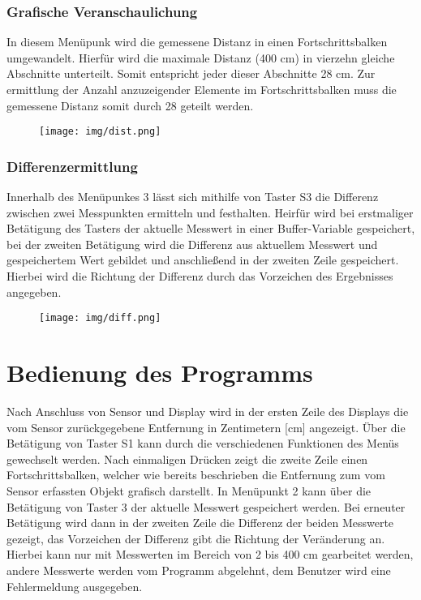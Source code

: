 \documentclass[german]{article}
\begin{document}
\subsubsection{Grafische Veranschaulichung}

In diesem Menüpunk wird die gemessene Distanz in einen Fortschrittsbalken umgewandelt. Hierfür wird die maximale Distanz (400 cm) in vierzehn gleiche Abschnitte unterteilt. Somit entspricht jeder dieser Abschnitte 28 cm. Zur ermittlung der Anzahl anzuzeigender Elemente im Fortschrittsbalken muss die gemessene Distanz somit durch 28 geteilt werden.
\begin{figure}[H]\centering\texttt{[image: img/dist.png]}\end{figure}

\subsubsection{Differenzermittlung}

Innerhalb des Menüpunkes 3 lässt sich mithilfe von Taster S3 die Differenz zwischen zwei Messpunkten ermitteln und festhalten. Heirfür wird bei erstmaliger Betätigung des Tasters der aktuelle Messwert in einer Buffer-Variable gespeichert, bei der zweiten Betätigung wird die Differenz aus aktuellem Messwert und gespeichertem Wert gebildet und anschließend in der zweiten Zeile gespeichert. Hierbei wird die Richtung der Differenz durch das Vorzeichen des Ergebnisses angegeben.
\begin{figure}[H]\centering\texttt{[image: img/diff.png]}\end{figure}

\section{Bedienung des Programms}

Nach Anschluss von Sensor und Display wird in der ersten Zeile des Displays die vom Sensor zurückgegebene Entfernung in Zentimetern [cm] angezeigt. Über die Betätigung von Taster S1 kann durch die verschiedenen Funktionen des Menüs gewechselt werden. Nach einmaligen Drücken zeigt die zweite Zeile einen Fortschrittsbalken, welcher wie bereits beschrieben die Entfernung zum vom Sensor erfassten Objekt grafisch darstellt. In Menüpunkt 2 kann über die Betätigung von Taster 3 der aktuelle Messwert gespeichert werden. Bei erneuter Betätigung wird dann in der zweiten Zeile die Differenz der beiden Messwerte gezeigt, das Vorzeichen der Differenz gibt die Richtung der Veränderung an. Hierbei kann nur mit Messwerten im Bereich von 2 bis 400 cm gearbeitet werden, andere Messwerte werden vom Programm abgelehnt, dem Benutzer wird eine Fehlermeldung ausgegeben.
\end{document}
